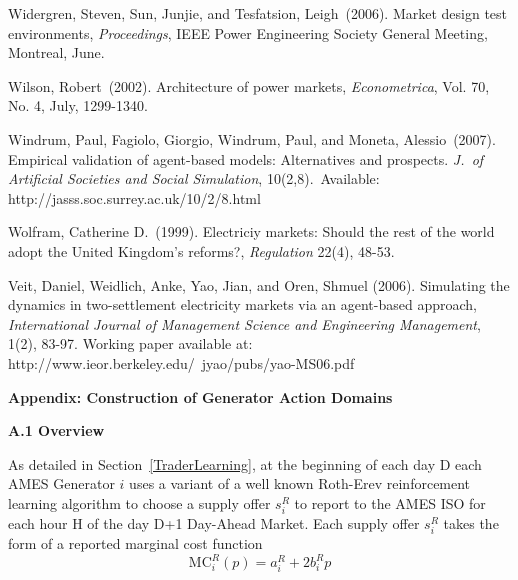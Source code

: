 \documentclass[12pt]{article}
\begin{document}
\begin{description}
\item Widergren, Steven, Sun, Junjie, and Tesfatsion, Leigh~(2006).  Market design test environments, 
\textit{Proceedings\/}, IEEE Power Engineering Society General Meeting, Montreal, June.

\item Wilson, Robert~(2002).  Architecture of power markets, \textit{Econometrica\/}, Vol. 70, No. 4, July, 1299-1340.

\item Windrum, Paul, Fagiolo, Giorgio, Windrum, Paul, and Moneta, Alessio~(2007). Empirical validation of 
agent-based models: Alternatives and prospects. \textit{J.~of Artificial Societies and Social Simulation\/},
10(2,8).~Available: http://jasss.soc.surrey.ac.uk/10/2/8.html


\item Wolfram, Catherine D.~(1999).  Electriciy markets: Should the rest of the world adopt the United Kingdom's reforms?, \textit{Regulation\/} 22(4), 48-53.

\item Veit, Daniel, Weidlich, Anke, Yao, Jian, and Oren, Shmuel (2006).  Simulating the dynamics in two-settlement electricity markets via an agent-based approach, \textit{International Journal of Management Science and Engineering Management\/}, 1(2), 83-97. Working paper available at:  http://www.ieor.berkeley.edu/~jyao/pubs/yao-MS06.pdf

\pagebreak

\end{description}



\bigskip
\noindent
\textbf{\Large Appendix: Construction of Generator Action Domains}

\bigskip
\noindent
\textbf{\large A.1 Overview}

\medskip
\noindent
As detailed in 
Section~\ref{TraderLearning}, at the beginning of each day D each
AMES Generator $i$ uses a variant of a well known Roth-Erev reinforcement learning algorithm to choose a 
supply offer $s^R_i$ to report to the AMES ISO for each hour H of the day D+1  Day-Ahead Market.  Each supply 
offer $s^R_i$ takes the form of a reported marginal cost function 
\begin{equation} \label{AppReportedMC}
              \mbox{MC}^R_i(p) = a^R_i + 2b^R_i p  
\end{equation}
\end{document}
